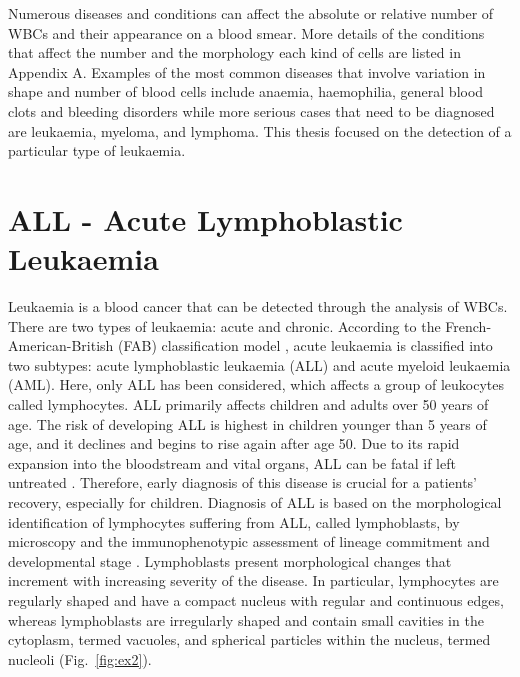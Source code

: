 \documentclass[final,a4paper,12pt,english]{UnicaPhdThesis3}
\begin{document}
Numerous diseases and conditions can affect the absolute or relative number of WBCs and their appearance on a blood smear. More details of the conditions that affect the number and the morphology each kind of cells are listed in Appendix A. Examples of the most common diseases that involve variation in shape and number of blood cells include anaemia, haemophilia, general blood clots and bleeding disorders while more serious cases that need to be diagnosed are leukaemia, myeloma, and lymphoma. This thesis focused on the detection of a particular type of leukaemia.  

\section{ALL - Acute Lymphoblastic Leukaemia}
Leukaemia is a blood cancer that can be detected through the analysis of WBCs. There are two types of leukaemia: acute and chronic. According to the French-American-British (FAB) classification model \cite{Bennett}, acute leukaemia is classified into two subtypes: acute lymphoblastic leukaemia (\acs{ALL}) and acute myeloid leukaemia (AML). Here, only ALL has been considered, which affects a group of leukocytes called lymphocytes. ALL primarily affects children and adults over 50 years of age. The risk of developing ALL is highest in children younger than 5 years of age, and it declines and begins to rise again after age 50. Due to its rapid expansion into the bloodstream and vital organs, ALL can be fatal if left untreated \cite{Biondi}. Therefore, early diagnosis of this disease is crucial for a patients' recovery, especially for children. Diagnosis of ALL is based on the morphological identification of lymphocytes suffering from ALL, called lymphoblasts, by microscopy and the immunophenotypic assessment of lineage commitment and developmental stage \cite{Inaba}. Lymphoblasts present morphological changes that increment with increasing severity of the disease. In particular, lymphocytes are regularly shaped and have a compact nucleus with regular and continuous edges, whereas lymphoblasts are irregularly shaped and contain small cavities in the cytoplasm, termed vacuoles, and spherical particles within the nucleus, termed nucleoli \cite{Donida} (Fig.~\ref{fig:ex2}).
\end{document}
